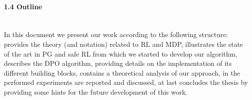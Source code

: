 \paragraph{1.4 Outline} \mbox{} \\
\newline
In this document we present our work according to the following structure:  provides the theory (and notation) related to \acf{RL} and \acf{MDP},  illustrates the state of the art in \acf{PG} and safe \ac{RL} from which we started to develop our algorithm,  describes the \ac{DPO} algorithm, providing details on the implementation of its different building blocks,  contains a theoretical analysis of our approach, in  the performed experiments are reported and discussed, at last  concludes the thesis by providing some hints for the future development of this work.